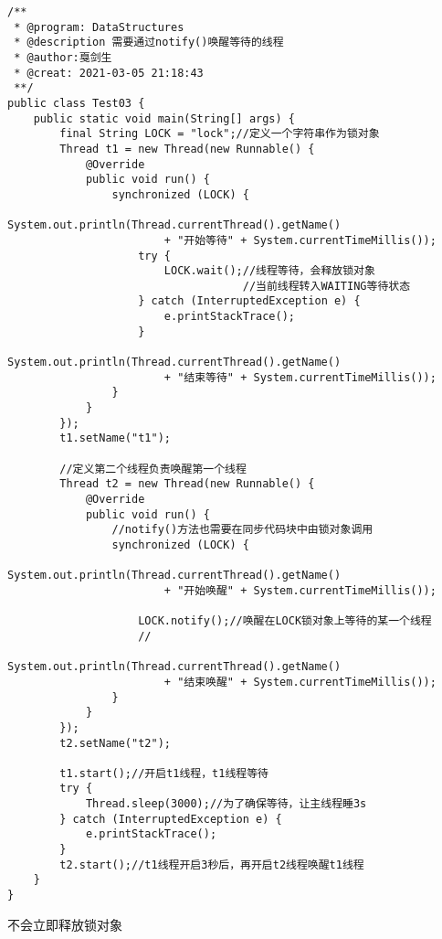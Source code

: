 \documentclass[a4paper]{report}
\begin{document}
\begin{Verbatim}[frame=single,numbersep=5pt,xleftmargin=1.5em,xrightmargin=1.5em]
/**
 * @program: DataStructures
 * @description 需要通过notify()唤醒等待的线程
 * @author:戛剑生
 * @creat: 2021-03-05 21:18:43
 **/
public class Test03 {
    public static void main(String[] args) {
        final String LOCK = "lock";//定义一个字符串作为锁对象
        Thread t1 = new Thread(new Runnable() {
            @Override
            public void run() {
                synchronized (LOCK) {
                    System.out.println(Thread.currentThread().getName()
                        + "开始等待" + System.currentTimeMillis());
                    try {
                        LOCK.wait();//线程等待，会释放锁对象
                                    //当前线程转入WAITING等待状态
                    } catch (InterruptedException e) {
                        e.printStackTrace();
                    }
                    System.out.println(Thread.currentThread().getName()
                        + "结束等待" + System.currentTimeMillis());
                }
            }
        });
        t1.setName("t1");

        //定义第二个线程负责唤醒第一个线程
        Thread t2 = new Thread(new Runnable() {
            @Override
            public void run() {
                //notify()方法也需要在同步代码块中由锁对象调用
                synchronized (LOCK) {
                    System.out.println(Thread.currentThread().getName()
                        + "开始唤醒" + System.currentTimeMillis());

                    LOCK.notify();//唤醒在LOCK锁对象上等待的某一个线程
                    //
                    System.out.println(Thread.currentThread().getName()
                        + "结束唤醒" + System.currentTimeMillis());
                }
            }
        });
        t2.setName("t2");

        t1.start();//开启t1线程，t1线程等待
        try {
            Thread.sleep(3000);//为了确保等待，让主线程睡3s
        } catch (InterruptedException e) {
            e.printStackTrace();
        }
        t2.start();//t1线程开启3秒后，再开启t2线程唤醒t1线程
    }
}\end{Verbatim}

不会立即释放锁对象
\end{document}
